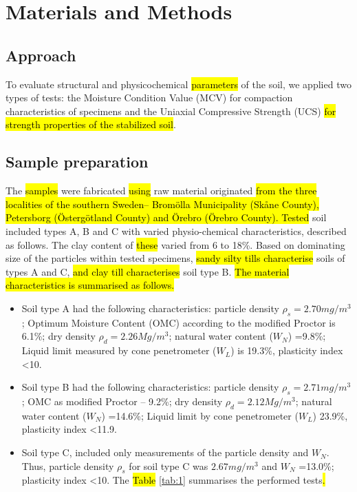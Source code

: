 \documentclass[electronics,article,submit,pdftex,moreauthors]{Definitions/mdpi}
\begin{document}
\section{Materials and Methods}

\subsection{Approach}

To evaluate\hl{ }structural and physicochemical \hl{parameters} of the soil, we applied two types of tests: the Moisture Condition Value (MCV) for compaction characteristics of specimens\hl{ }and the Uniaxial Compressive Strength (UCS) \hl{for strength properties of the stabilized soil}. 

\subsection{Sample preparation}
The \hl{samples }were fabricated \hl{using} raw material originated \hl{from the three localities of the southern Sweden-- Brom\"olla Municipality (Sk\aa ne County), Petersborg (\"Osterg\"otland County) and \"Orebro (\"Orebro County). Tested} soil included\hl{ }types A, B and C with varied physio-chemical characteristics, described as follows. The clay content of \hl{these} varied from 6 to 18\%. Based on\hl{ }dominating size of the particles within tested specimens, \hl{sandy silty tills characterise} soils of types A and C, \hl{and clay till characterises} soil type B. \hl{The material characteristics is summarised as follows.}

\begin{itemize}
     \item Soil type A had the following characteristics: particle density $\rho _s =2.70 mg/m^3$ ; Optimum Moisture Content (OMC) according to the modified Proctor is 6.1\%; dry density $\rho _d = 2.26 Mg/m^3$; natural water content ($W_N$) =9.8\%; Liquid limit measured by cone penetrometer ($W_L$) is 19.3\%, plasticity index <10. 
     \item Soil type B had the following characteristics: particle density $\rho _s = 2.71 mg/m^3$; OMC as modified Proctor – 9.2\%; dry density $\rho _d = 2.12 Mg/m^3$; natural water content ($W_N$) =14.6\%; Liquid limit by cone penetrometer ($W_L$) 23.9\%, plasticity index <11.9. 
     \item Soil type C, included only measurements of the particle density and $W_N$. Thus, particle density $\rho _s$ for soil type C was $2.67 mg/m^3$ and $W_N$ =13.0\%; plasticity index <10. The \hl{Table} \ref{tab:1} summarises the performed tests\hl{.} 
\end{itemize}
\end{document}
